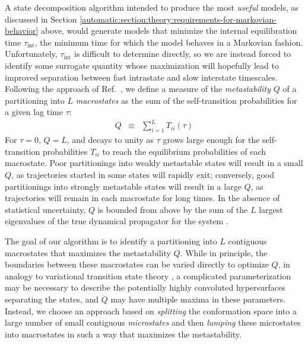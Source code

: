 A state decomposition algorithm intended to produce the most \emph{useful} models, as discussed in Section \ref{automatic:section:theory:requirements-for-markovian-behavior} above, would generate models that minimize the internal equilibration time $\tau_\mathrm{int}$, the minimum time for which the model behaves in a Markovian fashion.
Unfortunately, $\tau_\mathrm{int}$ is difficult to determine directly, so we are instead forced to identify some surrogate quantity whose maximization will hopefully lead to improved separation between fast intrastate and slow interstate timescales.
Following the approach of Ref.\ \cite{huisinga:2005a}, we define a measure of the \emph{metastability} $Q$ of a partitioning into $L$ \emph{macrostates} as the sum of the self-transition probabilities for a given lag time $\tau$:
\begin{eqnarray}
Q &\equiv& \sum_{i=1}^L T_{ii}(\tau) \label{automatic:equation:metastability}
\end{eqnarray}
For $\tau = 0$, $Q = L$, and decays to unity as $\tau$ grows large enough for the self-transition probabilities $T_{ii}$ to reach the equilibrium probabilities of each macrostate.
Poor partitionings into weakly metastable states will result in a small $Q$, as trajectories started in some states will rapidly exit; conversely, good partitionings into strongly metastable states will result in a large $Q$, as trajectories will remain in each macrostate for long times.
In the absence of statistical uncertainty, $Q$ is bounded from above by the sum of the $L$ largest eigenvalues of the true dynamical propagator for the system \cite{huisinga:2005a}.

The goal of our algorithm is to identify a partitioning into $L$ contiguous macrostates that maximizes the metastability $Q$.
While in principle, the boundaries between these macrostates can be varied directly to optimize $Q$, in analogy to variational transition state theory \cite{truhlar:1996a}, a complicated parameterization may be necessary to describe the potentially highly convoluted hypersurfaces separating the states, and $Q$ may have multiple maxima in these parameters.
Instead, we choose an approach based on \emph{splitting} the conformation space into a large number of small contiguous \emph{microstates} and then \emph{lumping} these microstates into macrostates in such a way that maximizes the metastability.

